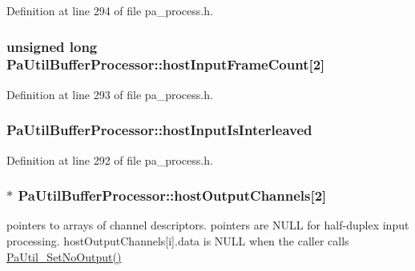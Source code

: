 Definition at line 294 of file pa\+\_\+process.\+h.

\subsubsection[{\texorpdfstring{host\+Input\+Frame\+Count}{hostInputFrameCount}}]{\setlength{\rightskip}{0pt plus 5cm}unsigned long Pa\+Util\+Buffer\+Processor\+::host\+Input\+Frame\+Count\mbox{[}2\mbox{]}}\hypertarget{struct_pa_util_buffer_processor_a9a72a362c2a3b03b6badd0ecfd72837c}{}\label{struct_pa_util_buffer_processor_a9a72a362c2a3b03b6badd0ecfd72837c}


Definition at line 293 of file pa\+\_\+process.\+h.

\subsubsection[{\texorpdfstring{host\+Input\+Is\+Interleaved}{hostInputIsInterleaved}}]{ Pa\+Util\+Buffer\+Processor\+::host\+Input\+Is\+Interleaved}\hypertarget{struct_pa_util_buffer_processor_a5bcaa1f67c5f868a2947c1026880f6d6}{}\label{struct_pa_util_buffer_processor_a5bcaa1f67c5f868a2947c1026880f6d6}


Definition at line 292 of file pa\+\_\+process.\+h.

\subsubsection[{\texorpdfstring{host\+Output\+Channels}{hostOutputChannels}}]{$\ast$ Pa\+Util\+Buffer\+Processor\+::host\+Output\+Channels\mbox{[}2\mbox{]}}\hypertarget{struct_pa_util_buffer_processor_a6d78b9d008d30e6addc9a83470756831}{}\label{struct_pa_util_buffer_processor_a6d78b9d008d30e6addc9a83470756831}
pointers to arrays of channel descriptors. pointers are N\+U\+LL for half-\/duplex input processing. host\+Output\+Channels\mbox{[}i\mbox{]}.data is N\+U\+LL when the caller calls \hyperlink{pa__process_8c_ad8300bdb4ebf2aaad4b0bf8813af5695}{Pa\+Util\+\_\+\+Set\+No\+Output()} 

